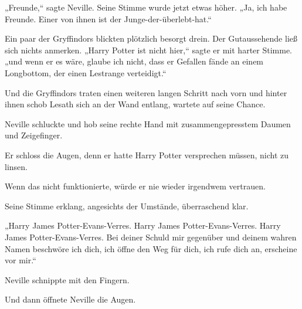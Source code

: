„Freunde,“ sagte Neville. Seine Stimme wurde jetzt etwas höher. „Ja, ich habe Freunde. Einer von ihnen ist der Junge-der-überlebt-hat.“

Ein paar der Gryffindors blickten plötzlich besorgt drein. Der Gutaussehende ließ sich nichts anmerken. „Harry Potter ist nicht hier,“ sagte er mit harter Stimme. „und wenn er es wäre, glaube ich nicht, dass er Gefallen fände an einem Longbottom, der einen Lestrange verteidigt.“

Und die Gryffindors traten einen weiteren langen Schritt nach vorn und hinter ihnen schob Lesath sich an der Wand entlang, wartete auf seine Chance.

Neville schluckte und hob seine rechte Hand mit zusammengepresstem Daumen und Zeigefinger.

Er schloss die Augen, denn er hatte Harry Potter versprechen müssen, nicht zu linsen.

Wenn das nicht funktionierte, würde er nie wieder irgendwem vertrauen.

Seine Stimme erklang, angesichts der Umstände, überraschend klar.

„Harry James Potter-Evans-Verres. Harry James Potter-Evans-Verres. Harry James Potter-Evans-Verres. Bei deiner Schuld mir gegenüber und deinem wahren Namen beschwöre ich dich, ich öffne den Weg für dich, ich rufe dich an, erscheine vor mir.“

Neville schnippte mit den Fingern.

Und dann öffnete Neville die Augen.

